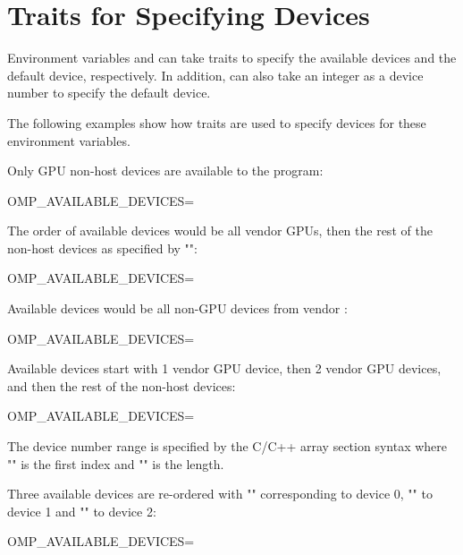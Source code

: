 \section{Traits for Specifying Devices}
\label{sec:device_env_traits}


Environment variables  and
 can take traits to specify the available
devices and the default device, respectively.
In addition,  can also take an integer
as a device number to specify the default device.

The following examples show how traits are used to specify devices
for these environment variables.

Only GPU non-host devices are available to the program:
\begin{boxedcode}
OMP_AVAILABLE_DEVICES= 
\end{boxedcode}

The order of available devices would be all vendor  GPUs, then 
the rest of the non-host devices as specified by "\ucode{*}":
\begin{boxedcode}
OMP_AVAILABLE_DEVICES=
\end{boxedcode}

Available devices would be all non-GPU devices from vendor :
\begin{boxedcode}
OMP_AVAILABLE_DEVICES=
\end{boxedcode}

Available devices start with 1 vendor  GPU device, then 
2 vendor  GPU devices, and then the rest of the non-host devices:
\begin{boxedcode}
OMP_AVAILABLE_DEVICES=
\end{boxedcode}
The device number range is specified by the C/C++ array section syntax
\ucode{[0:2]} where "" is the first index and ""
is the length.

Three available devices are re-ordered with "" corresponding 
to device 0, "" to device 1 and ""
to device 2:
\begin{boxedcode}
OMP_AVAILABLE_DEVICES=
\end{boxedcode}

